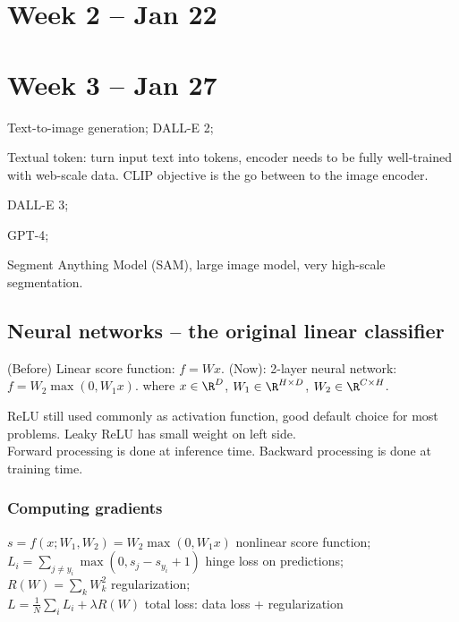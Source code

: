 \documentclass[11pt, oneside]{book}
\begin{document}
\pagebreak

\section{Week 2 -- Jan 22}



\section{Week 3 -- Jan 27}
Text-to-image generation; DALL-E 2;

Textual token: turn input text into tokens, encoder needs to be fully well-trained with web-scale data. CLIP objective is the go between to the image encoder.

DALL-E 3;

GPT-4;

Segment Anything Model (SAM), large image model, very high-scale segmentation.

\subsection{Neural networks -- the original linear classifier}
(Before) Linear score function: $f = Wx$.
(Now): 2-layer neural network: $f = W_2 \max(0, W_1 x)$.
where $x \in \R^D$, $W_1 \in \R^{H \times D}$, $W_2 \in \R^{C \times H}$.

ReLU still used commonly as activation function, good default choice for most problems.
Leaky ReLU has small weight on left side. \\

Forward processing is done at inference time. Backward processing is done at training time. \\

\subsubsection{Computing gradients}
$ s = f(x; W_1, W_2) = W_2 \max(0, W_1 x) $ nonlinear score function; \\

$ L_i = \sum_{j \neq y_i} \max(0, s_j - s_{y_i} + 1) $ hinge loss on predictions; \\

$ R(W) = \sum_{k} W_k ^2 $ regularization; \\

$ L = \frac{1}{N} \sum_i L_i + \lambda R(W) $ total loss: data loss + regularization
\end{document}
